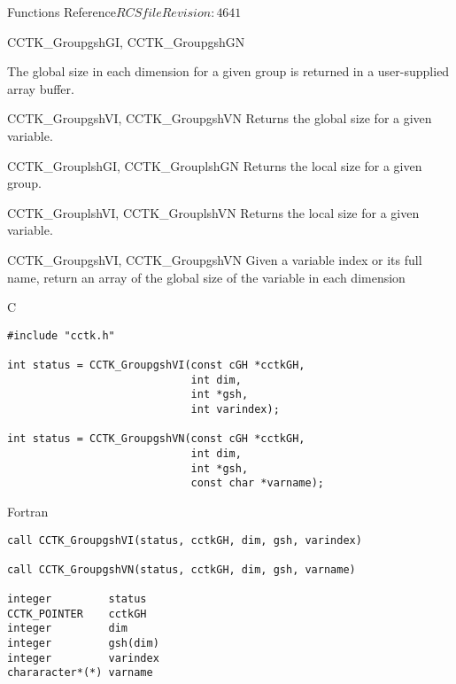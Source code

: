 \begin{cactuspart}{ Functions Reference}{$RCSfile$}{$Revision: 4641 $}
\begin{FunctionDescription}{CCTK\_GroupgshGI, CCTK\_GroupgshGN}
\begin{Discussion}
The global size in each dimension for a given group is returned in a user-supplied array buffer.
\end{Discussion}

\begin{SeeAlsoSection}
\begin{SeeAlso}{CCTK\_GroupgshVI, CCTK\_GroupgshVN}
Returns the global size for a given variable.
\end{SeeAlso}
\begin{SeeAlso}{CCTK\_GrouplshGI, CCTK\_GrouplshGN}
Returns the local size for a given group.
\end{SeeAlso}
\begin{SeeAlso}{CCTK\_GrouplshVI, CCTK\_GrouplshVN}
Returns the local size for a given variable.
\end{SeeAlso}
\end{SeeAlsoSection}
\end{FunctionDescription}


\begin{FunctionDescription}{CCTK\_GroupgshVI, CCTK\_GroupgshVN}
\label{CCTK-GroupgshVI}
\label{CCTK-GroupgshVN}
Given a variable index or its full name, return an array of the global size of the variable in each dimension

\begin{SynopsisSection}
\begin{Synopsis}{C}
\begin{verbatim}
#include "cctk.h"

int status = CCTK_GroupgshVI(const cGH *cctkGH,
                             int dim,
                             int *gsh,
                             int varindex);

int status = CCTK_GroupgshVN(const cGH *cctkGH,
                             int dim,
                             int *gsh,
                             const char *varname);
\end{verbatim}
\end{Synopsis}
\begin{Synopsis}{Fortran}
\begin{verbatim}
call CCTK_GroupgshVI(status, cctkGH, dim, gsh, varindex)

call CCTK_GroupgshVN(status, cctkGH, dim, gsh, varname)

integer         status
CCTK_POINTER    cctkGH
integer         dim
integer         gsh(dim)
integer         varindex
chararacter*(*) varname
\end{verbatim}
\end{Synopsis}
\end{SynopsisSection}


\end{FunctionDescription}
\end{cactuspart}
